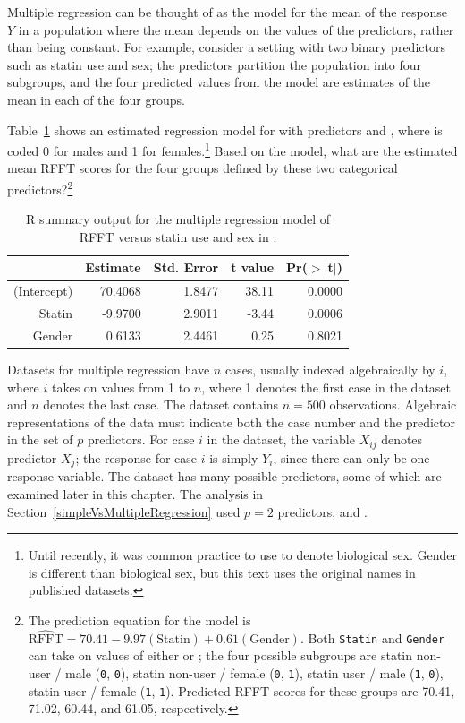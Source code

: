 Multiple regression can be thought of as the model for the mean of the response $Y$ in a population where the mean depends on the values of the predictors, rather than being constant. For example, consider a setting with two binary predictors such as statin use and sex; the predictors partition the population into four subgroups, and the four predicted values from the model are estimates of the mean in each of the four groups.

\begin{exercise}
Table~\ref{prevendRFFTStatinGenderRegression} shows an estimated regression model for  with predictors  and , where  is coded 0 for males and 1 for females.\footnote{Until recently, it was common practice to use  to denote biological sex. Gender is different than biological sex, but this text uses the original names in published datasets.}  Based on the model, what are the estimated mean RFFT scores for the four groups defined by these two categorical predictors?\footnote{The prediction equation for the model is $\widehat{\text{RFFT}} = 70.41 - 9.97(\text{Statin}) + 0.61(\text{Gender})$. Both \texttt{Statin} and \texttt{Gender} can take on values of either  or ; the four possible subgroups are statin non-user / male (\texttt{0}, \texttt{0}), statin non-user / female (\texttt{0}, \texttt{1}), statin user / male (\texttt{1}, \texttt{0}), statin user / female (\texttt{1}, \texttt{1}). Predicted RFFT scores for these groups are 70.41, 71.02, 60.44, and 61.05, respectively.} 
\begin{table}[ht]
\centering
\begin{tabular}{rrrrr}
  \hline
 & Estimate & Std. Error & t value & Pr($>$$|$t$|$) \\ 
  \hline
(Intercept) & 70.4068 & 1.8477 & 38.11 & 0.0000 \\ 
  Statin & -9.9700 & 2.9011 & -3.44 & 0.0006 \\ 
  Gender & 0.6133 & 2.4461 & 0.25 & 0.8021 \\ 
   \hline
\end{tabular}
\caption{\textsf{R} summary output for the multiple regression model of RFFT versus statin use and sex in .}
\label{prevendRFFTStatinGenderRegression}
\end{table}
\end{exercise}

Datasets for multiple regression have $n$ cases, usually indexed algebraically by $i$, where $i$ takes on values from 1 to $n$, where 1 denotes the first case in the dataset and $n$ denotes the last case.  The dataset  contains $n = 500$ observations.  Algebraic representations of the data must indicate both the case number and the predictor in the set of $p$ predictors. For case $i$ in the dataset, the variable $X_{ij}$ denotes predictor $X_j$; the response for case $i$ is simply $Y_i$, since there can only be one response variable. The dataset  has many possible predictors, some of which are examined later in this chapter.  The analysis in Section~\ref{simpleVsMultipleRegression} used $p=2$ predictors,  and .

